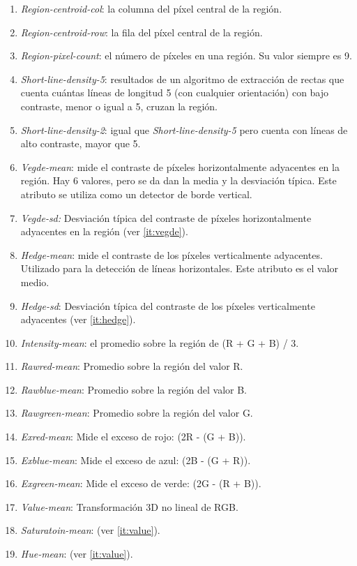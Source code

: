 \documentclass[11pt,a4paper]{article}
\begin{document}
\begin{enumerate}
	\item \textit{Region-centroid-col}: la columna del píxel central de la región.
	\item \textit{Region-centroid-row}: la fila del píxel central de la región. 
	\item \textit{Region-pixel-count}: el número de píxeles en una región. Su valor siempre es 9. 
	\item \textit{Short-line-density-5}: resultados de un algoritmo de extracción de rectas que cuenta cuántas líneas de longitud 5
	(con cualquier orientación) con bajo contraste, menor o igual a 5, cruzan la región. 
	\item \textit{Short-line-density-2}: igual que \textit{Short-line-density-5} pero cuenta con líneas de alto contraste,
	mayor que 5. 
	\item \label{it:vegde} \textit{Vegde-mean}: mide el contraste de píxeles horizontalmente adyacentes en la región. Hay 6 valores,
	pero se da dan la media y la desviación típica. Este atributo se utiliza como un detector de borde vertical. 
	\item \textit{Vegde-sd:} Desviación típica del contraste de píxeles horizontalmente adyacentes en la región (ver \ref{it:vegde}).
	\item \label{it:hedge} \textit{Hedge-mean}: mide el contraste de los píxeles verticalmente adyacentes.
	Utilizado para la detección de líneas horizontales. Este atributo es el valor medio.
	\item \textit{Hedge-sd}: Desviación típica del contraste de los píxeles verticalmente adyacentes (ver \ref{it:hedge}). 
	\item \textit{Intensity-mean}: el promedio sobre la región de (R + G + B) / 3.
	\item \textit{Rawred-mean}: Promedio sobre la región del valor R. 
	\item \textit{Rawblue-mean}: Promedio sobre la región del valor B. 
	\item \textit{Rawgreen-mean}: Promedio sobre la región del valor G. 
	\item \textit{Exred-mean}: Mide el exceso de rojo: (2R - (G + B)).
	\item \textit{Exblue-mean}: Mide el exceso de azul: (2B - (G + R)).
	\item \textit{Exgreen-mean}: Mide el exceso de verde: (2G - (R + B)).
	\item \label{it:value} \textit{Value-mean}: Transformación 3D no lineal de RGB.
	\item \textit{Saturatoin-mean}: (ver \ref{it:value}).
	\item \textit{Hue-mean}: (ver \ref{it:value}).
\end{enumerate}
\end{document}

